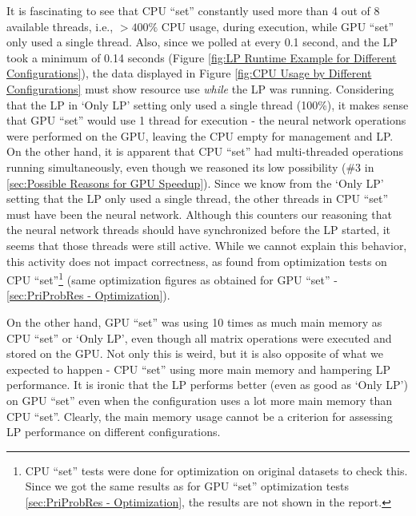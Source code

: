 \begin{appendices}
    It is fascinating to see that CPU ``set'' constantly used more than 4 out of 8 available threads, i.e., $>400\%$ CPU usage, during execution, while GPU ``set'' only used a single thread. Also, since we polled at every 0.1 second, and the LP took a minimum of 0.14 seconds (Figure \ref{fig:LP Runtime Example for Different Configurations}), the data displayed in Figure \ref{fig:CPU Usage by Different Configurations} must show resource use \textit{while} the LP was running. Considering that the LP in `Only LP' setting only used a single thread (100\%), it makes sense that GPU ``set'' would use 1 thread for execution - the neural network operations were performed on the GPU, leaving the CPU empty for management and LP. On the other hand, it is apparent that CPU ``set'' had multi-threaded operations running simultaneously, even though we reasoned its low possibility (\#3 in \cref{sec:Possible Reasons for GPU Speedup}). Since we know from the `Only LP' setting that the LP only used a single thread, the other threads in CPU ``set'' must have been the neural network. Although this counters our reasoning that the neural network threads should have synchronized before the LP started, it seems that those threads were still active. While we cannot explain this behavior, this activity does not impact correctness, as found from optimization tests on CPU ``set''\footnote{CPU ``set'' tests were done for optimization on original datasets to check this. Since we got the same results as for GPU ``set'' optimization tests \cref{sec:PriProbRes - Optimization}, the results are not shown in the report.} (same optimization figures as obtained for GPU ``set'' - \cref{sec:PriProbRes - Optimization}).
    
    On the other hand, GPU ``set'' was using 10 times as much main memory as CPU ``set'' or `Only LP', even though all matrix operations were executed and stored on the GPU. Not only this is weird, but it is also opposite of what we expected to happen - CPU ``set'' using more main memory and hampering LP performance. It is ironic that the LP performs better (even as good as `Only LP') on GPU ``set'' even when the configuration uses a lot more main memory than CPU ``set''. Clearly, the main memory usage cannot be a criterion for assessing LP performance on different configurations.
    \begin{figure}[!htbp]
        \centering
        \begin{minipage}{.49\textwidth}
            \centering
\end{minipage}
\end{figure}
\end{appendices}
